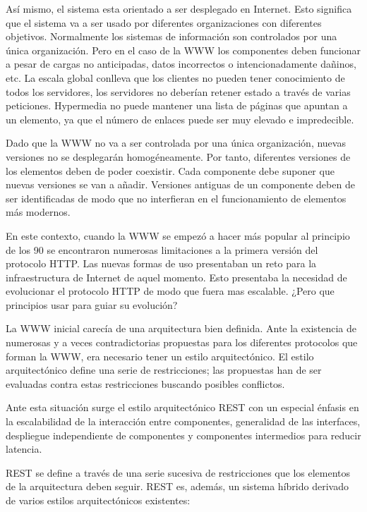 Así mismo, el sistema esta orientado a ser desplegado en
Internet. Esto significa que el sistema va a ser usado por diferentes
organizaciones con diferentes objetivos. Normalmente los sistemas de
información son controlados por una única organización. Pero en el
caso de la WWW los componentes deben funcionar a pesar de cargas no
anticipadas, datos incorrectos o intencionadamente dañinos, etc. La
escala global conlleva que los clientes no pueden tener conocimiento
de todos los servidores, los servidores no deberían retener estado a
través de varias peticiones. Hypermedia no puede mantener una lista de
páginas que apuntan a un elemento, ya que el número de enlaces puede
ser muy elevado e impredecible.

Dado que la WWW no va a ser controlada por una única organización,
nuevas versiones no se desplegarán homogéneamente. Por tanto,
diferentes versiones de los elementos deben de poder coexistir. Cada
componente debe suponer que nuevas versiones se van a añadir.
Versiones antiguas de un componente deben de ser identificadas de modo
que no interfieran en el funcionamiento de elementos más modernos.

En este contexto, cuando la WWW se empezó a hacer más popular al
principio de los 90 se encontraron numerosas limitaciones a la primera
versión del protocolo HTTP. Las nuevas formas de uso presentaban un
reto para la infraestructura de Internet de aquel momento. Esto
presentaba la necesidad de evolucionar el protocolo HTTP de modo que
fuera mas escalable. ¿Pero que principios usar para guiar su evolución?

La WWW inicial carecía de una arquitectura bien definida. Ante la
existencia de numerosas y a veces contradictorias propuestas para los
diferentes protocolos que forman la WWW, era necesario tener un estilo
arquitectónico. El estilo arquitectónico define una serie de
restricciones; las propuestas han de ser evaluadas contra estas
restricciones buscando posibles conflictos.

Ante esta situación surge el estilo arquitectónico REST con un
especial énfasis en la escalabilidad de la interacción entre
componentes, generalidad de las interfaces, despliegue independiente
de componentes y componentes intermedios para reducir latencia.

REST se define a través de una serie sucesiva de restricciones que los
elementos de la arquitectura deben seguir. REST es, además, un sistema
híbrido derivado de varios estilos arquitectónicos existentes:

